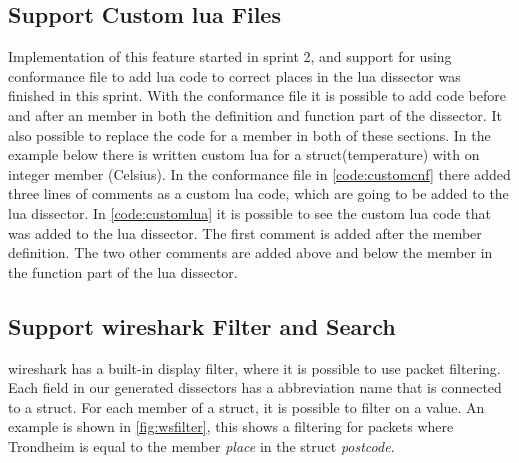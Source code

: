 \subsection{Support Custom \Gls{lua} Files}
Implementation of this feature started in sprint 2, and support for using 
conformance file to add \Gls{lua} code to correct places in the \Gls{lua} \gls{dissector} was 
finished in this sprint. With the conformance file it is possible to add code 
before and after an \gls{member} in both the definition and function part of the 
\gls{dissector}. It also possible to replace the code for a \gls{member} in both of these 
sections. In the example below there is written custom \Gls{lua} for a 
\gls{struct}(temperature) with on \gls{integer} \gls{member} (Celsius). In the conformance file 
in \autoref{code:customcnf} there added three lines of comments as a custom 
\Gls{lua} code, which are going to be added to the \Gls{lua} \gls{dissector}. In 
\autoref{code:customlua} it is possible to see the custom \Gls{lua} code that was 
added to the \Gls{lua} \gls{dissector}. The first comment is added after the \gls{member} 
definition. The two other comments are added above and below the \gls{member} in the 
function part of the \Gls{lua} \gls{dissector}.





\subsection{Support \Gls{wireshark} Filter and Search}
\Gls{wireshark} has a built-in display filter, where it is possible to use \gls{packet} filtering. 
Each field in our generated \glspl{dissector} has a abbreviation name that is 
connected to a \gls{struct}. For each \gls{member} of a \gls{struct}, it is possible to filter 
on a value. An example is shown in \autoref{fig:wsfilter}, this shows a 
filtering for \glspl{packet} where Trondheim is equal to the \gls{member} \emph{place} in 
the \gls{struct} \emph{postcode}. 

